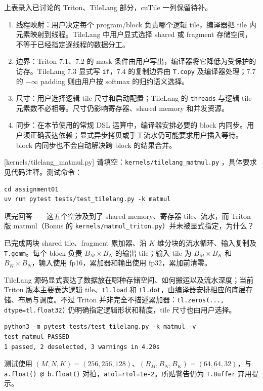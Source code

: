 \documentclass[11pt,a4paper,fontset=none]{ctexart}
\begin{document}
\begin{tcolorbox}[title={7.5 已讨论部分与适用范围},breakable]
上表录入已讨论的 Triton、TileLang 部分，cuTile 一列保留待补。
\begin{enumerate}[label=(\alph*)]
  \item 线程映射：用户决定每个 program/block 负责哪个逻辑 tile，编译器把 tile 内元素映射到线程。TileLang 中用户显式选择 shared 或 fragment 存储空间，不等于已经指定逐线程的数据分工。
  \item 边界：Triton 7.1、7.2 的 mask 条件由用户写出，编译器将它降低为受保护的访存。TileLang 7.3 显式写 \texttt{if}，7.4 的复制边界由 \texttt{T.copy} 及编译器处理；7.7 的 $-\infty$ padding 则由用户按 softmax 的归约语义选择。
  \item 尺寸：用户选择逻辑 tile 尺寸和启动配置；TileLang 的 \texttt{threads} 与逻辑 tile 元素数不必相等。尺寸仍影响寄存器、shared memory 和并发资源。
  \item 同步：在本节使用的常规 DSL 运算中，编译器安排必要的 block 内同步。用户须正确表达依赖；显式异步拷贝或手工流水仍可能要求用户插入等待。block 内同步也不会自动解决跨 block 的结果合并。
\end{enumerate}
\end{tcolorbox}

[kernels/tilelang\_matmul.py]
请填空：\texttt{kernels/tilelang\_matmul.py} ，具体要求见代码注释。测试命令：

\begin{lstlisting}
cd assignment01
uv run pytest tests/test_tilelang.py -k matmul
\end{lstlisting}

填完回答——这五个空涉及到了 shared memory、寄存器 tile、流水，而 Triton 版 matmul（Bonus 的 \texttt{kernels/matmul\_triton.py}）并未被显式指定，为什么？

\begin{tcolorbox}[title={7.6 实现、作答与正确性记录},breakable]
已完成两块 shared tile、fragment 累加器、沿 $K$ 维分块的流水循环、输入复制及 \texttt{T.gemm}。每个 block 负责 $B_M\times B_N$ 的输出 tile；输入 tile 为 $B_M\times B_K$ 和 $B_K\times B_N$，输入使用 fp16，累加器和输出使用 fp32，累加前清零。

TileLang 源码显式表达了数据放在哪种存储空间、如何搬运以及流水深度；当前 Triton 版本主要表达逻辑 tile、\texttt{tl.load} 和 \texttt{tl.dot}，由编译器安排相应的底层存储、布局与调度。不过 Triton 并非完全不描述累加器：\texttt{tl.zeros(..., dtype=tl.float32)} 仍明确指定逻辑形状和精度，tile 尺寸也由用户选择。

\begin{lstlisting}
python3 -m pytest tests/test_tilelang.py -k matmul -v
test_matmul PASSED
1 passed, 2 deselected, 3 warnings in 4.20s
\end{lstlisting}
测试使用 $(M,N,K)=(256,256,128)$、$(B_M,B_N,B_K)=(64,64,32)$，与 \texttt{a.float() @ b.float()} 对拍，\texttt{atol=rtol=1e-2}。所贴警告仍为 \texttt{T.Buffer} 弃用提示。
\end{tcolorbox}
\end{document}
